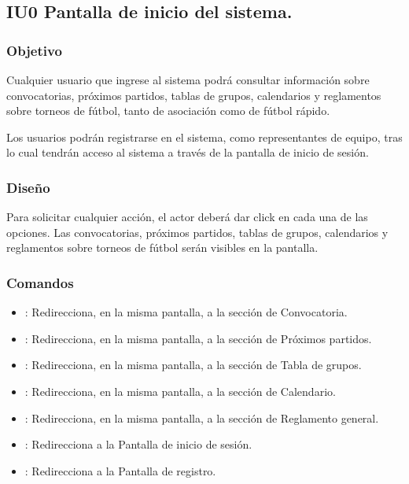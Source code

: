 \subsection{IU0 Pantalla de inicio del sistema.}

\subsubsection{Objetivo}
	Cualquier usuario que ingrese al sistema podrá consultar información sobre convocatorias, próximos partidos, tablas de grupos, calendarios y reglamentos sobre torneos de fútbol, tanto de asociación como de fútbol rápido.

Los usuarios podrán registrarse en el sistema, como representantes de equipo, tras lo cual tendrán acceso al sistema a través de la pantalla de inicio de sesión.
\subsubsection{Diseño}
  Para solicitar cualquier acción, el actor deberá dar click en cada una de las opciones.
  Las convocatorias, próximos partidos, tablas de grupos, calendarios y reglamentos sobre torneos de fútbol serán visibles en la pantalla.



\subsubsection{Comandos}
\begin{itemize}
	\item {}: Redirecciona, en la misma pantalla, a la sección de Convocatoria.
  \item {}: Redirecciona, en la misma pantalla, a la sección de Próximos partidos.
  \item {}: Redirecciona, en la misma pantalla, a la sección de Tabla de grupos.
  \item {}: Redirecciona, en la misma pantalla, a la sección de Calendario.
  \item {}: Redirecciona, en la misma pantalla, a la sección de Reglamento general.  
  \item {}: Redirecciona a la Pantalla de inicio de sesión.
  \item {}: Redirecciona a la Pantalla de registro.
\end{itemize}
